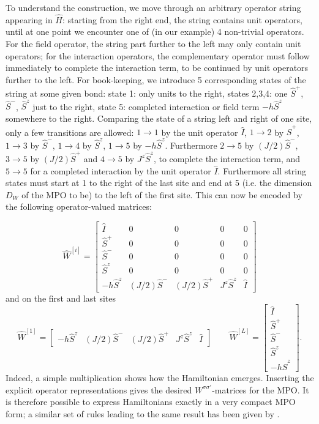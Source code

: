 To understand the construction, we move through an arbitrary operator string appearing in $\hat{H}$: starting from the right end, the string contains unit operators, until at one point we encounter one of (in our example) 4 non-trivial operators. For the field operator, the string part further to the left may only contain unit operators; for the interaction operators, the complementary operator must follow immediately to complete the interaction term, to be continued by unit operators further to the left. For book-keeping, we introduce 5 corresponding states of the string at some given bond: state 1: only units to the right,
states 2,3,4: one $\hat{S}^+$, $\hat{S}^-$, $\hat{S}^z$ just to the right, state 5: completed interaction or field term $-h\hat{S}^z$ somewhere to the right. Comparing the state of a string left and right of one site, only a few transitions are allowed: $1 \rightarrow 1$ by the unit operator $\hat{I}$, $1 \rightarrow 2$ by $\hat{S}^+$, $1 \rightarrow 3$ by $\hat{S}^-$, $1 \rightarrow 4$ by $\hat{S}^z$, $1 \rightarrow 5$ by $-h\hat{S}^z$. Furthermore $2\rightarrow 5$ by $(J/2)\hat{S}^-$, $3 \rightarrow 5$ by $(J/2)\hat{S}^+$ and $4 \rightarrow 5$ by $J^z\hat{S}^z$, to complete the interaction term, and $5 \rightarrow 5$ for a completed interaction by the unit operator $\hat{I}$. Furthermore all string states must start at 1 to the right of the last site and end at 5 (i.e. the dimension $D_W$ of the MPO to be) to the left of the first site. This can now be encoded by the following operator-valued matrices:

\begin{equation}
\hat{W}^{[i]} = \left[
\begin{array}{ccccc}
\hat{I} & 0 & 0 & 0 & 0 \\
\hat{S}^+ & 0 & 0 & 0 & 0 \\
\hat{S}^- & 0 & 0 & 0 & 0 \\
\hat{S}^z & 0 & 0 & 0 & 0 \\
-h\hat{S}^z & (J/2)\hat{S}^- & (J/2)\hat{S}^+ & J^z\hat{S}^z & \hat{I}
\end{array}
\right]
\end{equation}
and on the first and last sites
\begin{equation}
\hat{W}^{[1]} = \left[
\begin{array}{ccccc}
-h\hat{S}^z & (J/2)\hat{S}^- & (J/2)\hat{S}^+ & J^z\hat{S}^z & \hat{I} 
\end{array}
\right]
\quad\quad 
\hat{W}^{[L]} = \left[
\begin{array}{c}
\hat{I} \\ \hat{S}^+ \\ \hat{S}^- \\ \hat{S}^z \\ -h\hat{S}^z 
\end{array}
\right] .
\end{equation}
Indeed, a simple multiplication shows how the Hamiltonian emerges. Inserting the explicit operator representations gives the desired $W^{\sigma\sigma'}$-matrices for the MPO. It is therefore possible to express Hamiltonians exactly in a very compact MPO form; a similar set of rules leading to the same result has been given by \cite{Crosswhite08a}.

